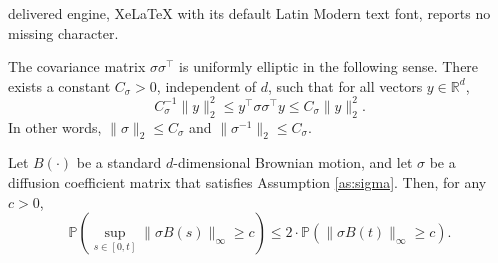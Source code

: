 \documentclass[10pt,a4paper]{amsart}
\newcommand{\pr}{\mathbb{P}}
\begin{document}
delivered engine, XeLaTeX with its default Latin Modern text font, reports no missing character.
\begin{assumption}\label{as:sigma} %
The covariance matrix $\sigma \sigma^{\top}$ is uniformly elliptic in the following sense.  
There exists a constant $C_\sigma > 0$, 
independent of $d$, such that for all vectors $y \in \mathbb{R}^d$,
\[
 C_\sigma^{-1} \|y\|_2^2 \le y^{\top} \sigma \sigma^{\top} y \le C_\sigma \|y\|_2^2.
\]
In other words, $\|\sigma\|_2 \le C_\sigma$ and $\|\sigma^{-1}\|_2 \le C_\sigma$.
\end{assumption}

\begin{lemma}\label{lem:sigmaB}
Let $B(\cdot)$ be a standard $d$-dimensional Brownian motion, and let $\sigma$ be a diffusion coefficient matrix 
that satisfies Assumption \ref{as:sigma}. Then, for any $c > 0$, 
\begin{equation}\label{eq:sigmaB-reflection}
\pr\left(\sup_{s\in [0,t]} \|\sigma B(s)\|_\infty \geq c \right) \leq 2\cdot \pr\left(\|\sigma B(t)\|_\infty \geq c\right).
\end{equation}
\end{lemma}
\end{document}

